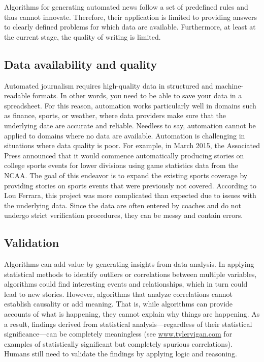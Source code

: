 \documentclass[notoc, symmetric, nobib, nols]{towcenter-guideto-book}
\begin{document}
Algorithms for generating automated news follow a set of predefined rules and thus cannot innovate. Therefore, their application is limited to providing answers to clearly defined problems for which data are available. Furthermore, at least at the current stage, the quality of writing is limited.  

\subsection{Data availability and quality}

Automated journalism requires high-quality data in structured and machine-readable formats. In other words, you need to be able to save your data in a spreadsheet. For this reason, automation works particularly well in domains such as finance, sports, or weather, where data providers make sure that the underlying date are accurate and reliable. Needless to say, automation cannot be applied to domains where no data are available. Automation is challenging in situations where data quality is poor. For example, in March 2015, the Associated Press announced that it would commence automatically producing stories on college sports events for lower divisions using game statistics data from the NCAA. The goal of this endeavor is to expand the existing sports coverage by providing stories on sports events that were previously not covered. According to Lou Ferrara, this project was more complicated than expected due to issues with the underlying data. Since the data are often entered by coaches and do not undergo strict verification procedures, they can be messy and contain errors. 

\subsection{Validation}

Algorithms can add value by generating insights from data analysis. In applying statistical methods to identify outliers or correlations between multiple variables, algorithms could find interesting events and relationships, which in turn could lead to new stories. However, algorithms that analyze correlations cannot establish causality or add meaning. That is, while algorithms can provide accounts of what is happening, they cannot explain why things are happening.\autocite{lazer14} As a result, findings derived from statistical analysis---regardless of their statistical significance---can be completely meaningless (see \href{www.tylervigan.com}{www.tylervigan.com} for examples of statistically significant but completely spurious correlations). Humans still need to validate the findings by applying logic and reasoning.\autocite{latar15}
\end{document}
